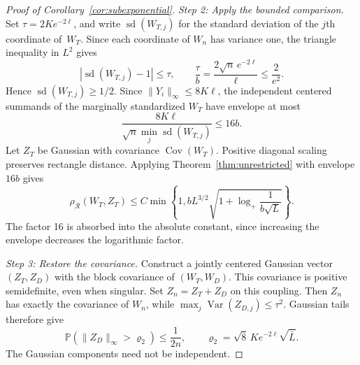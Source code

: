 \documentclass[11pt,letterpaper]{article}
\newif\ifshowrev
\newcommand{\rs}[1]{\ifshowrev{\color{revblue}#1}\else#1\fi}
\newif\ifshowskill
\newcommand{\skl}[1]{\ifshowskill{\color{revblue}%
\hypersetup{linkcolor=revblue,citecolor=revblue,urlcolor=revblue}#1}\else#1\fi}
\newcommand{\sks}[1]{\ifshowskill{\color{revblue}#1}\else#1\fi}
\theoremstyle{remark}
\newcommand{\Pp}{\mathbb P}
\newcommand{\Cov}{\operatorname{Cov}}
\newcommand{\Var}{\operatorname{Var}}
\newcommand{\rh}{\rho_{\mathcal R}}
\begin{document}
\begin{proof}[Proof of Corollary~\ref{cor:subexponential}]
\emph{Step 2: Apply the bounded comparison.}
Set \(\tau=2Ke^{-\sks{2\ell}}\)\skl{, and write \(\operatorname{sd}(W_{T,j})\) for the
standard deviation of the \(j\)th coordinate of~\(W_T\)}.
Since each coordinate of \(W_n\) has variance one, the triangle
inequality in \(L^2\) gives
\[
 |\sks{\operatorname{sd}(W_{T,j})}-1|\le\tau,
 \qquad \frac\tau b=\frac{2\sqrt n\,e^{-2\ell}}\ell
 \le\frac2{e^2}.
\]
Hence \(\sks{\operatorname{sd}(W_{T,j})}\ge1/2\). Since \(\|Y_i\|_\infty\le\sks{8K\ell}\), the
independent centered \rs{summands} of the marginally standardized \(W_T\)
have envelope at most
\[
 \frac{\sks{8K\ell}}{\sqrt n\min_j\sks{\operatorname{sd}(W_{T,j})}}\le16b.
\]
Let \(Z_T\) be Gaussian with covariance \(\Cov(W_T)\).
Positive diagonal scaling preserves rectangle distance. Applying
Theorem~\ref{thm:unrestricted} with envelope \(16b\) gives
\begin{equation}
 \rh(W_T,Z_T)\le C\min\left\{1,
 bL^{3/2}\sqrt{1+\log_+\frac1{b\sqrt L}}\right\}.
 \label{tail:bounded-comparison}
\end{equation}
The factor 16 is absorbed into the absolute constant, since increasing
the envelope decreases the logarithmic factor.

\emph{Step 3: Restore the covariance.}
Construct a jointly centered Gaussian vector \((Z_T,\sks{Z_D})\) with the
block covariance of \((W_T,\sks{W_D})\). This covariance is positive
semidefinite, even when singular. Set \(Z_n=Z_T+\sks{Z_D}\) on this coupling.
Then \(Z_n\) has exactly the covariance of \(W_n\), while
\(\max_j\Var(\sks{Z_{D,j}})\le\tau^2\). Gaussian tails therefore give
\begin{equation}
 \Pp(\|\sks{Z_D}\|_\infty>\sks{\varrho_2})\le\frac1{2n},\qquad
 \sks{\varrho_2}=\sqrt8\,Ke^{-\sks{2\ell}}\sqrt{\sks{\bar L}}.
 \label{tail:Gaussian-coupling}
\end{equation}
The Gaussian components need not be independent.


\end{proof}
\end{document}
